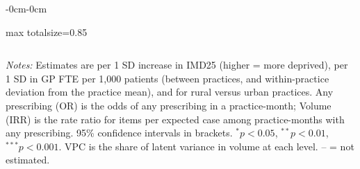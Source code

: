 \begin{landscape}
\begin{table}[htbp]
\begin{adjustwidth}{-0cm}{-0cm}
\begin{adjustbox}{max totalsize={\linewidth}{0.85\textheight}}
\begin{tabular}{lcccccccccc}
\bottomrule
\end{tabular}
\end{adjustbox}
\end{adjustwidth}
\par\vspace{4pt}
{\footnotesize \textit{Notes:} Estimates are per 1 SD increase in IMD25 (higher = more deprived), per 1 SD in GP FTE per 1,000 patients (between practices, and within-practice deviation from the practice mean), and for rural versus urban practices. Any prescribing (OR) is the odds of any prescribing in a practice-month; Volume (IRR) is the rate ratio for items per expected case among practice-months with any prescribing. 95\% confidence intervals in brackets. $^{*}p<0.05$, $^{**}p<0.01$, $^{***}p<0.001$. VPC is the share of latent variance in volume at each level. -- = not estimated.\par}
\end{table}
\end{landscape}
